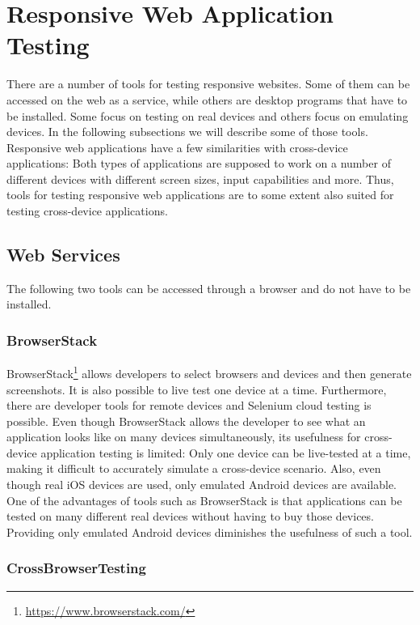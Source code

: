 \section{Responsive Web Application Testing}

There are a number of tools for testing responsive websites. Some of them can be accessed on the web as a service, while others are desktop programs that have to be installed. Some focus on testing on real devices and others focus on emulating devices. In the following subsections we will describe some of those tools. Responsive web applications have a few similarities with cross-device applications: Both types of applications are supposed to work on a number of different devices with different screen sizes, input capabilities and more. Thus, tools for testing responsive web applications are to some extent also suited for testing cross-device applications.

\subsection{Web Services}

The following two tools can be accessed through a browser and do not have to be installed.

\subsubsection{BrowserStack}

BrowserStack\footnote{\url{https://www.browserstack.com/}} allows developers to select browsers and devices and then generate screenshots. It is also possible to live test one device at a time. Furthermore, there are developer tools for remote devices and Selenium cloud testing is possible. Even though BrowserStack allows the developer to see what an application looks like on many devices simultaneously, its usefulness for cross-device application testing is limited: Only one device can be live-tested at a time, making it difficult to accurately simulate a cross-device scenario. Also, even though real iOS devices are used, only emulated Android devices are available. One of the advantages of tools such as BrowserStack is that applications can be tested on many different real devices without having to buy those devices. Providing only emulated Android devices diminishes the usefulness of such a tool.

\subsubsection{CrossBrowserTesting}

